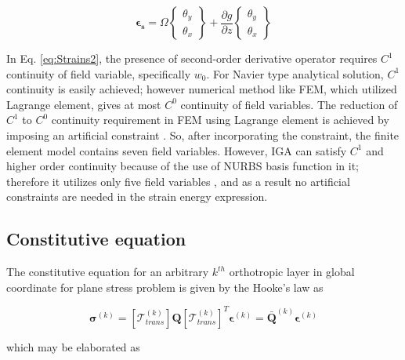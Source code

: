 \documentclass[3p,preprint,12pt]{elsarticle}
\begin{document}
\begin{equation*}
\boldsymbol{\epsilon_{s}}= \Omega \left\{ \begin{array}{c}
\theta_{y}\\
\theta_{x}
\end{array}\right\} +\frac{\partial g}{\partial z}\left\{ \begin{array}{c}
\theta_{y}\\
\theta_{x}
\end{array}\right\} 
\end{equation*}

In Eq. \cref{eq:Strains2}, the presence of second-order derivative operator requires $C^{1}$ continuity of field variable, specifically $w_{0}$. For Navier type analytical solution, $C^{1}$ continuity is easily achieved; however numerical method like FEM, which utilized Lagrange element, gives at most $C^{0}$ continuity of field variables. The reduction of $C^{1}$ to $C^{0}$ continuity requirement in FEM using Lagrange element is achieved by imposing an artificial constraint \cite{grover2014efficient}. So, after incorporating the constraint, the finite element model contains seven field variables. However, IGA can satisfy $C^{1}$ and higher order continuity because of the use of NURBS basis function in it; therefore it utilizes only five field variables \cite{talha2010static}, and as a result no artificial constraints are needed in the strain energy expression.


\subsection{Constitutive equation}
The constitutive equation for an arbitrary $k^{th}$ orthotropic layer in global coordinate for plane stress problem is given by the Hooke's law as

\begin{equation}
\boldsymbol{\sigma}^{\left(k\right)}
=\left[\mathcal{T}_{trans}^{\left(k\right)}\right] \boldsymbol{Q} \left[\mathcal{T}_{trans}^{\left(k\right)}\right]^{T}  \boldsymbol{\epsilon}^{\left(k\right)}
=\bar{\boldsymbol{Q}}^{\left(k\right)} \boldsymbol{\epsilon}^{\left(k\right)}\label{eq:ConstitutiveEquation}
\end{equation}

which may be elaborated as
\end{document}
